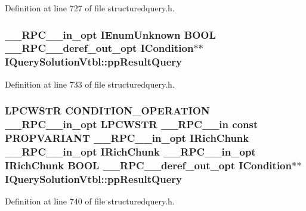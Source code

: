 Definition at line 727 of file structuredquery.\+h.

\subsubsection[{\texorpdfstring{pp\+Result\+Query}{ppResultQuery}}]{ {\bf \+\_\+\+\_\+\+R\+P\+C\+\_\+\+\_\+in\+\_\+opt} I\+Enum\+Unknown {\bf B\+O\+OL} {\bf \+\_\+\+\_\+\+R\+P\+C\+\_\+\+\_\+deref\+\_\+out\+\_\+opt} {\bf I\+Condition}$\ast$$\ast$ I\+Query\+Solution\+Vtbl\+::pp\+Result\+Query}\hypertarget{struct_i_query_solution_vtbl_a6e69e3fda74c8cdd426f417417c22080}{}\label{struct_i_query_solution_vtbl_a6e69e3fda74c8cdd426f417417c22080}


Definition at line 733 of file structuredquery.\+h.

\subsubsection[{\texorpdfstring{pp\+Result\+Query}{ppResultQuery}}]{ {\bf L\+P\+C\+W\+S\+TR} {\bf C\+O\+N\+D\+I\+T\+I\+O\+N\+\_\+\+O\+P\+E\+R\+A\+T\+I\+ON} {\bf \+\_\+\+\_\+\+R\+P\+C\+\_\+\+\_\+in\+\_\+opt} {\bf L\+P\+C\+W\+S\+TR} {\bf \+\_\+\+\_\+\+R\+P\+C\+\_\+\+\_\+in} {\bf const} {\bf P\+R\+O\+P\+V\+A\+R\+I\+A\+NT} {\bf \+\_\+\+\_\+\+R\+P\+C\+\_\+\+\_\+in\+\_\+opt} {\bf I\+Rich\+Chunk} {\bf \+\_\+\+\_\+\+R\+P\+C\+\_\+\+\_\+in\+\_\+opt} {\bf I\+Rich\+Chunk} {\bf \+\_\+\+\_\+\+R\+P\+C\+\_\+\+\_\+in\+\_\+opt} {\bf I\+Rich\+Chunk} {\bf B\+O\+OL} {\bf \+\_\+\+\_\+\+R\+P\+C\+\_\+\+\_\+deref\+\_\+out\+\_\+opt} {\bf I\+Condition}$\ast$$\ast$ I\+Query\+Solution\+Vtbl\+::pp\+Result\+Query}\hypertarget{struct_i_query_solution_vtbl_ad7de2b030b43f023fb9e5e36f08c66fe}{}\label{struct_i_query_solution_vtbl_ad7de2b030b43f023fb9e5e36f08c66fe}


Definition at line 740 of file structuredquery.\+h.

